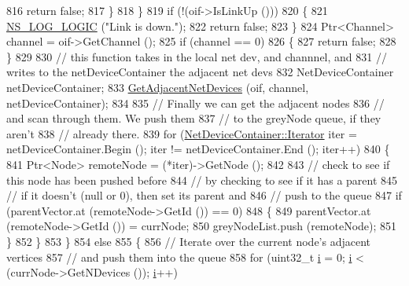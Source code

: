 \begin{DoxyCode}
816                   \textcolor{keywordflow}{return} \textcolor{keyword}{false};
817                 \}
818             \}
819           \textcolor{keywordflow}{if} (!(oif->IsLinkUp ()))
820             \{
821               \hyperlink{group__logging_ga88acd260151caf2db9c0fc84997f45ce}{NS\_LOG\_LOGIC} (\textcolor{stringliteral}{"Link is down."});
822               \textcolor{keywordflow}{return} \textcolor{keyword}{false};
823             \}
824           Ptr<Channel> channel = oif->GetChannel ();
825           \textcolor{keywordflow}{if} (channel == 0)
826             \{ 
827               \textcolor{keywordflow}{return} \textcolor{keyword}{false};
828             \}
829 
830           \textcolor{comment}{// this function takes in the local net dev, and channnel, and}
831           \textcolor{comment}{// writes to the netDeviceContainer the adjacent net devs}
832           NetDeviceContainer netDeviceContainer;
833           \hyperlink{classns3_1_1Ipv4NixVectorRouting_a1037f3752d6583eca8cd83c72e0673ea}{GetAdjacentNetDevices} (oif, channel, netDeviceContainer);
834 
835           \textcolor{comment}{// Finally we can get the adjacent nodes}
836           \textcolor{comment}{// and scan through them.  We push them}
837           \textcolor{comment}{// to the greyNode queue, if they aren't }
838           \textcolor{comment}{// already there.}
839           \textcolor{keywordflow}{for} (\hyperlink{classns3_1_1NetDeviceContainer_a45709bb572f975569ed985fa89b132f8}{NetDeviceContainer::Iterator} iter = netDeviceContainer.Begin ();
       iter != netDeviceContainer.End (); iter++)
840             \{
841               Ptr<Node> remoteNode = (*iter)->GetNode ();
842 
843               \textcolor{comment}{// check to see if this node has been pushed before}
844               \textcolor{comment}{// by checking to see if it has a parent}
845               \textcolor{comment}{// if it doesn't (null or 0), then set its parent and }
846               \textcolor{comment}{// push to the queue}
847               \textcolor{keywordflow}{if} (parentVector.at (remoteNode->GetId ()) == 0)
848                 \{
849                   parentVector.at (remoteNode->GetId ()) = currNode;
850                   greyNodeList.push (remoteNode);
851                 \}
852             \}
853         \}
854       \textcolor{keywordflow}{else}
855         \{
856           \textcolor{comment}{// Iterate over the current node's adjacent vertices}
857           \textcolor{comment}{// and push them into the queue}
858           \textcolor{keywordflow}{for} (uint32\_t \hyperlink{bernuolliDistribution_8m_a6f6ccfcf58b31cb6412107d9d5281426}{i} = 0; \hyperlink{bernuolliDistribution_8m_a6f6ccfcf58b31cb6412107d9d5281426}{i} < (currNode->GetNDevices ()); \hyperlink{bernuolliDistribution_8m_a6f6ccfcf58b31cb6412107d9d5281426}{i}++)

\end{DoxyCode}
